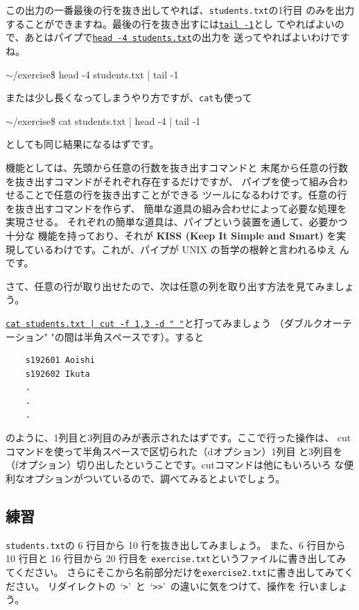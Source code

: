 \documentclass[a4j]{ltjreport}
\begin{document}
    この出力の一番最後の行を抜き出してやれば、\verb+students.txt+の1行目
    のみを出力することができますね。最後の行を抜き出すには\underline{\texttt{tail -1}}とし
    てやればよいので、あとはパイプで\underline{\texttt{head -4 students.txt}}の出力を
    送ってやればよいわけですね。
    \begin{screen}
        $\sim$/exercise\$ head  -4  students.txt  |  tail  -1 
    \end{screen}
    または少し長くなってしまうやり方ですが、\verb+cat+も使って
    \begin{screen}
        $\sim$/exercise\$ cat students.txt | head -4 | tail -1
    \end{screen}
    としても同じ結果になるはずです。

    機能としては、先頭から任意の行数を抜き出すコマンドと
    末尾から任意の行数を抜き出すコマンドがそれぞれ存在するだけですが、
    パイプを使って組み合わせることで任意の行を抜き出すことができる
    ツールになるわけです。任意の行を抜き出すコマンドを作らず、
    簡単な道具の組み合わせによって必要な処理を実現させる。
    それぞれの簡単な道具は、パイプという装置を通して、必要かつ十分な
    機能を持っており、それが \textbf{KISS (Keep It Simple and Smart)} 
    を実現しているわけです。これが、パイプが UNIX の哲学の根幹と言われるゆえ
    んです。

    さて、任意の行が取り出せたので、次は任意の列を取り出す方法を見てみましょう。

    \underline{\texttt{cat students.txt | cut -f 1,3 -d " "}}と打ってみましょう
    （ダブルクオーテーション" "の間は半角スペースです）。すると
    \begin{verbatim}
    s192601 Aoishi
    s192602 Ikuta
    .                                                
    .
    .
    \end{verbatim}
    のように、1列目と3列目のみが表示されたはずです。ここで行った操作は、
    cutコマンドを使って半角スペースで区切られた（dオプション）1列目
    と3列目を（fオプション）切り出したということです。cutコマンドは他にもいろいろ
    な便利なオプションがついているので、調べてみるとよいでしょう。
    \subsection{練習}
    \verb+students.txt+の 6 行目から 10 行を抜き出してみましょう。
    また、6 行目から 10 行目と 16 行目から 20 行目を
    \verb+exercise.txt+というファイルに書き出してみてください。
    さらにそこから名前部分だけを\verb+exercise2.txt+に書き出してみてください。
    リダイレクトの~`\verb+>+'~と~`\verb+>>+'~の違いに気をつけて、操作を
    行いましょう。
\end{document}
